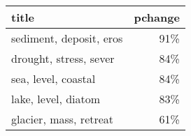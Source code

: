 \begin{tabular}{p{1.2cm}r}
\toprule
                   title &  pchange \\
\midrule
 sediment, deposit, eros &      91\% \\
  drought, stress, sever &      84\% \\
     sea, level, coastal &      84\% \\
     lake, level, diatom &      83\% \\
  glacier, mass, retreat &      61\% \\
\bottomrule
\end{tabular}
